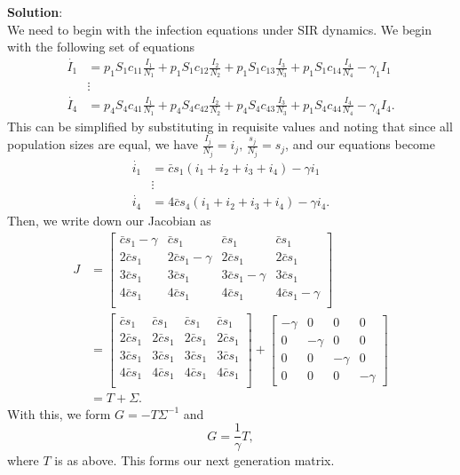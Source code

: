 \documentclass[11pt]{article}
\begin{document}
\begin{enumerate}
\begin{enumerate}[label=\alph*.]
	\begin{tcolorbox}[breakable]
		\textbf{Solution}:\\
		We need to begin with the infection equations under SIR dynamics. We begin with the following set of equations
		\begin{align*}
			\dot{I_1}&=p_1 S_1 c_{11}\frac{I_1}{N_1} + p_1 S_1 c_{12}\frac{I_2}{N_2}+ p_1 S_1 c_{13}\frac{I_3}{N_3}+ p_1 S_1 c_{14}\frac{I_4}{N_4}-\gamma_1I_1\\
			&\vdots\\
			\dot{I_4}&=p_4 S_4 c_{41}\frac{I_1}{N_1} + p_4 S_4 c_{42}\frac{I_2}{N_2}+ p_4 S_4 c_{43}\frac{I_3}{N_3}+ p_1 S_4 c_{44}\frac{I_4}{N_4}-\gamma_4 I_4.
		\end{align*}
		This can be simplified by substituting in requisite values and noting that since all population sizes are equal, we have $\frac{I_j}{N_j}=i_j, \,\frac{s_j}{N_j}=s_j$, and our equations become
		\begin{align*}
		\dot{i_1}&=\bar{c}s_1(i_1 + i_2 +i_3+  i_4)-\gamma i_1\\
		&\vdots\\
		\dot{i_4}&=4\bar{c}s_4(i_1 + i_2+ i_3+  i_4)-\gamma i_4.
		\end{align*}
		Then, we write down our Jacobian as
		\begin{align*}
			J &= \begin{bmatrix}
			\bar{c}s_1-\gamma&\bar{c}s_1&\bar{c}s_1&\bar{c}s_1\\
			2\bar{c}s_1&2\bar{c}s_1-\gamma&2\bar{c}s_1&2\bar{c}s_1\\
			3\bar{c}s_1&3\bar{c}s_1&3\bar{c}s_1-\gamma&3\bar{c}s_1\\
			4\bar{c}s_1&4\bar{c}s_1&4\bar{c}s_1&4\bar{c}s_1-\gamma\\
			\end{bmatrix}\\
			&=
			\begin{bmatrix}
			\bar{c}s_1&\bar{c}s_1&\bar{c}s_1&\bar{c}s_1\\
			2\bar{c}s_1&2\bar{c}s_1&2\bar{c}s_1&2\bar{c}s_1\\
			3\bar{c}s_1&3\bar{c}s_1&3\bar{c}s_1&3\bar{c}s_1\\
			4\bar{c}s_1&4\bar{c}s_1&4\bar{c}s_1&4\bar{c}s_1\\
			\end{bmatrix}
			+
			\begin{bmatrix}
			-\gamma&0&0&0\\
			0&-\gamma&0&0\\
			0&0&-\gamma&0\\
			0&0&0&-\gamma
			\end{bmatrix}\\
			&=
			T + \Sigma.
		\end{align*}
		With this, we form $G=-T\Sigma^{-1}$ and
		\begin{equation*}
			G = \frac{1}{\gamma}T,
		\end{equation*}
		where $T$ is as above. This forms our next generation matrix.
	\end{tcolorbox}
	

\end{enumerate}
\end{enumerate}
\end{document}

